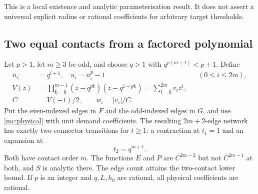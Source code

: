 This is a local existence and analytic parameterisation result. It does not assert a universal explicit radius or rational coefficients for arbitrary target thresholds.

\subsection{Two equal contacts from a factored polynomial}

\begin{theorem}\label{mc:double}
Let $p>1$, let $m\ge3$ be odd, and choose $q>1$ with $q^{p(m+1)}<p+1$. Define
\begin{align}
 n_i&=q^{i+1},\quad u_i=n_i^p-1 &&(0\le i\le2m),\nonumber\\
 V(z)&=\prod_{k=0}^{m-1}(z-q^{pk})(z-q^{1-pk})
       =\sum_{i=0}^{2m}v_iz^i,\label{mc:polynomial}\\
 C&=V(-1)/2,\qquad w_i=|v_i|/C.\nonumber
\end{align}
Put the even-indexed edges in $F$ and the odd-indexed edges in $G$, and use \eqref{mc:physical} with unit demand coefficients. The resulting $2m+2$-edge network has exactly two connector transitions for $t\ge1$: a contraction at $t_1=1$ and an expansion at
\begin{equation}\label{mc:doublethreshold}
 t_2=q^{m+1}.
\end{equation}
Both have contact order $m$. The functions $E$ and $P$ are $C^{2m-2}$ but not $C^{2m-1}$ at both, and $S$ is analytic there. The edge count attains the two-contact lower bound. If $p$ is an integer and $q,L,h_0$ are rational, all physical coefficients are rational.
\end{theorem}
